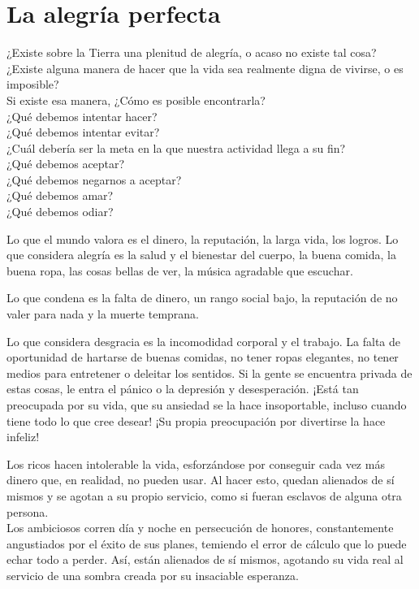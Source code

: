 \documentclass[book,b5paper,hidelinks,final]{memoir}
\begin{document}
	\chapter*{La alegría perfecta}
	
	¿Existe sobre la Tierra una plenitud de alegría, o acaso no existe tal
	cosa?\\
	¿Existe alguna manera de hacer que la vida sea realmente digna de
	vivirse, o es imposible?\\
	Si existe esa manera, ¿Cómo es posible encontrarla?\\
	¿Qué debemos intentar hacer?\\
	¿Qué debemos intentar evitar?\\
	¿Cuál debería ser la meta en la que nuestra actividad llega a su fin?\\
	¿Qué debemos aceptar?\\
	¿Qué debemos negarnos a aceptar?\\
	¿Qué debemos amar?\\
	¿Qué debemos odiar?
	
	Lo que el mundo valora es el dinero, la reputación, la larga vida, los
	logros. Lo que considera alegría es la salud y el bienestar del cuerpo,
	la buena comida, la buena ropa, las cosas bellas de ver, la música
	agradable que escuchar.
	
	Lo que condena es la falta de dinero, un rango social bajo, la
	reputación de no valer para nada y la muerte temprana.
	
	Lo que considera desgracia es la incomodidad corporal y el trabajo. La
	falta de oportunidad de hartarse de buenas comidas, no tener ropas
	elegantes, no tener medios para entretener o deleitar los sentidos. Si
	la gente se encuentra privada de estas cosas, le entra el pánico o la
	depresión y desesperación. ¡Está tan preocupada por su vida, que su
	ansiedad se la hace insoportable, incluso cuando tiene todo lo que cree
	desear! ¡Su propia preocupación por divertirse la hace infeliz!
	
	Los ricos hacen intolerable la vida, esforzándose por conseguir cada vez
	más dinero que, en realidad, no pueden usar. Al hacer esto, quedan
	alienados de sí mismos y se agotan a su propio servicio, como si fueran
	esclavos de alguna otra persona.\\
	Los ambiciosos corren día y noche en persecución de honores,
	constantemente angustiados por el éxito de sus planes, temiendo el error
	de cálculo que lo puede echar todo a perder. Así, están alienados de sí
	mismos, agotando su vida real al servicio de una sombra creada por su
	insaciable esperanza.
	
\end{document}
